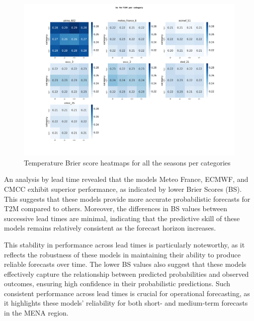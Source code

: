 \begin{figure}[H]
    \centering
    \includegraphics[width=1\linewidth]{plots/prob/bs/bs_T2M_category.png}
    \caption{Temperature Brier score heatmaps for all the seasons per categories}
\end{figure}
An analysis by lead time revealed that the models Meteo France, ECMWF, and CMCC exhibit superior performance, as indicated by lower Brier Scores (BS). This suggests that these models provide more accurate probabilistic forecasts for T2M compared to others. Moreover, the differences in BS values between successive lead times are minimal, indicating that the predictive skill of these models remains relatively consistent as the forecast horizon increases.

This stability in performance across lead times is particularly noteworthy, as it reflects the robustness of these models in maintaining their ability to produce reliable forecasts over time. The lower BS values also suggest that these models effectively capture the relationship between predicted probabilities and observed outcomes, ensuring high confidence in their probabilistic predictions. Such consistent performance across lead times is crucial for operational forecasting, as it highlights these models' reliability for both short- and medium-term forecasts in the MENA region.

